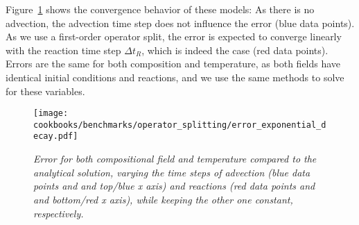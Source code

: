 \documentclass{article}
\begin{document}
Figure~\ref{fig:exponential-decay} shows the convergence behavior of these models: As there is no advection, the advection time step does not influence the error (blue data points). As we use a first-order operator split, the error is expected to converge linearly with the reaction time step $\Delta t_R$, which is indeed the case (red data points).
Errors are the same for both composition and temperature, as both fields have identical initial conditions and reactions, and we use the same methods to solve for these variables. 
\begin{figure}
  \begin{center}
    \texttt{[image: cookbooks/benchmarks/operator\_splitting/error\_exponential\_decay.pdf]}
  \end{center}
  \caption{\it Error for both compositional field and temperature compared to the analytical solution, varying the time steps of advection (blue data points and and top/blue x axis) and reactions (red data points and and bottom/red x axis), while keeping the other one constant, respectively.}
  \label{fig:exponential-decay}
\end{figure}
\end{document}
